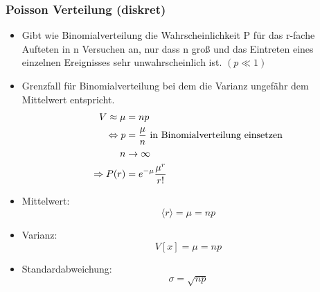 \documentclass[10pt,a4paper]{article}
\begin{document}
\newpage
\subsubsection{Poisson Verteilung (diskret)}
\begin{itemize}
\item Gibt wie Binomialverteilung die Wahrscheinlichkeit P für das r-fache Aufteten in n Versuchen an, nur dass n groß und das Eintreten eines einzelnen Ereignisses sehr unwahrscheinlich ist. $(p\ll 1)$
\item Grenzfall für Binomialverteilung bei dem die Varianz ungefähr dem Mittelwert entspricht.
\begin{align}
V \approx \mu &= np \notag \\
\Leftrightarrow p&= \frac{\mu}{n} \text{ in Binomialverteilung einsetzen}  \notag \\
n &\rightarrow \infty  \notag \\
\Rightarrow  P(r)&= e^{-\mu } \frac{\mu^r}{r!}
\end{align}
\item Mittelwert:
	\begin{equation}
		\langle r \rangle = \mu = np
	\end{equation} 
\item Varianz:
	\begin{equation}
		V[x]=\mu = np
	\end{equation}
\item Standardabweichung:
	\begin{equation}
		\sigma = \sqrt{np}
	\end{equation}
\end{itemize}


\newpage
\end{document}
